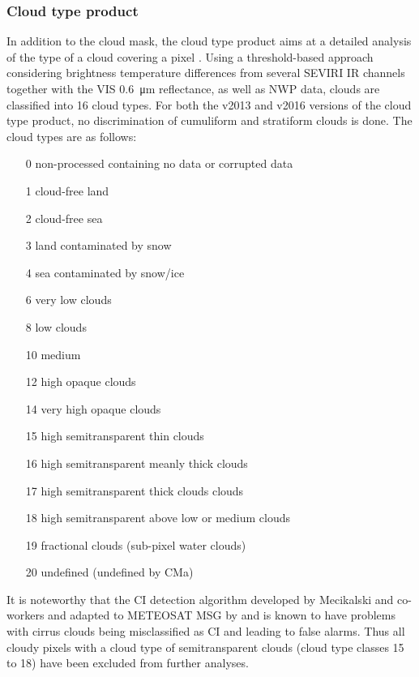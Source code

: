 \subsubsection{Cloud type product}
In addition to the cloud mask, the cloud type product aims at a detailed analysis of the type of a cloud covering a pixel \citep{NWCSAFWolken2014}. Using a threshold-based approach considering brightness temperature differences from several SEVIRI IR channels together with the VIS \SI{0.6}{\micro\metre} reflectance, as well as NWP data, clouds are classified into 16 cloud types. For both the v2013 and v2016 versions of the cloud type product, no discrimination of cumuliform and stratiform clouds is done. The cloud types are as follows:
\begin{itemize}
    \item [0] non-processed containing no data or corrupted data
    \item [1] cloud-free land
    \item [2] cloud-free sea
    \item [3] land contaminated by snow
	\item [4] sea contaminated by snow/ice
	\item [6] very low clouds
	\item [8] low clouds
	\item [10] medium  
	\item [12] high opaque clouds
	\item [14] very high opaque clouds
	\item [15] high semitransparent thin clouds
	\item [16] high semitransparent meanly thick clouds 
	\item [17] high semitransparent thick clouds clouds 
	\item [18] high semitransparent above low or medium clouds
	\item [19] fractional clouds (sub-pixel water clouds)
	\item [20] undefined (undefined by CMa)
\end{itemize}

It is noteworthy that the CI detection algorithm developed by Mecikalski and co-workers \citep{ MecikalskiBedka2006, MecikalskiBedkaPaechEtAl2008} and adapted to METEOSAT MSG by \citet{MecikalskiMacKenzieKoenigEtAl2010, MecikalskiMacKenzieKoenigEtAl2010a} and \citet{SiewertKoenigMecikalski2010} is known to have problems with cirrus clouds being misclassified as CI and leading to false alarms. Thus all cloudy pixels with a cloud type of semitransparent clouds (cloud type classes 15 to 18) have been excluded from further analyses.

